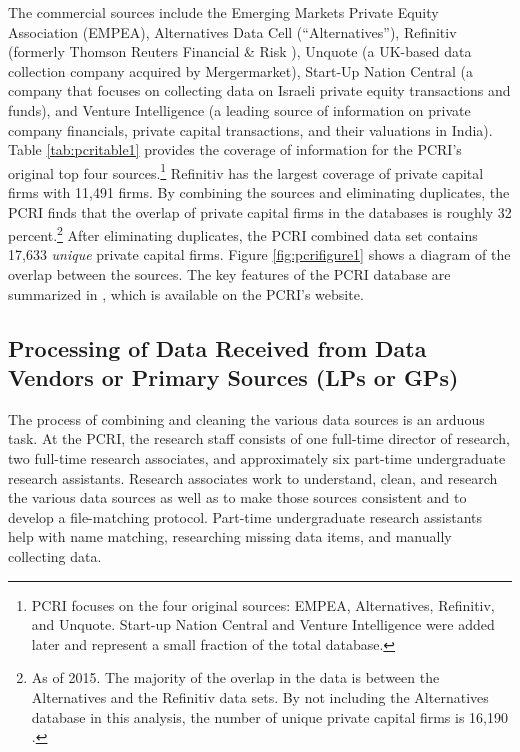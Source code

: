 The commercial sources include the Emerging Markets Private Equity Association (EMPEA), Alternatives Data Cell (``Alternatives''), Refinitiv (formerly Thomson Reuters Financial \& Risk ), Unquote (a UK-based data collection company acquired by Mergermarket), Start-Up Nation Central (a company that focuses on collecting data on Israeli private equity transactions and funds), and Venture Intelligence (a leading source of information on private company financials, private capital transactions, and their valuations in India). Table \ref{tab:pcritable1} provides the coverage of information for the PCRI's original top four sources.\footnote{PCRI focuses on the four original sources: EMPEA, Alternatives, Refinitiv, and Unquote. Start-up Nation Central and Venture Intelligence were added later and represent a small fraction of the total database.} Refinitiv has the largest coverage of private capital firms with 11,491 firms. By combining the sources and eliminating duplicates, the PCRI finds that the overlap of private capital firms in the databases is roughly 32 percent.\footnote{As of 2015. The majority of the overlap in the data is between the Alternatives and the Refinitiv data sets. By not including the Alternatives database in this analysis, the number of unique private capital firms is 16,190 \citep{jeng2015}.} After eliminating duplicates, the PCRI combined data set contains 17,633 \emph{unique} private capital firms. Figure \ref{fig:pcrifigure1} shows a diagram of the overlap between the sources. The key features of the PCRI database are summarized in \citet{jeng2015}, which is available on the PCRI's website.





\hypertarget{processing-of-data-received-from-data-vendors-or-primary-sources-lps-or-gps}{%
\subsection{Processing of Data Received from Data Vendors or Primary Sources (LPs or GPs)}\label{processing-of-data-received-from-data-vendors-or-primary-sources-lps-or-gps}}

The process of combining and cleaning the various data sources is an arduous task. At the PCRI, the research staff consists of one full-time director of research, two full-time research associates, and approximately six part-time undergraduate research assistants. Research associates work to understand, clean, and research the various data sources as well as to make those sources consistent and to develop a file-matching protocol. Part-time undergraduate research assistants help with name matching, researching missing data items, and manually collecting data.


